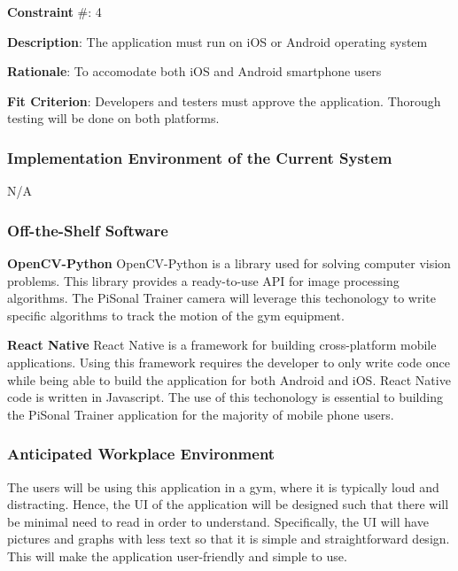 \documentclass{article}
\begin{document}
\medskip

\textbf{Constraint} \#: 4

\textbf{Description}: The application must run on iOS or Android operating system

\textbf{Rationale}: To accomodate both iOS and Android smartphone users

\textbf{Fit Criterion}: Developers and testers must approve the application. Thorough testing will be done on both platforms.

\medskip





\subsubsection{Implementation Environment of the Current System}
N/A

\subsubsection{Off-the-Shelf Software}
\textbf{OpenCV-Python}
OpenCV-Python is a library used for solving computer vision problems. This library provides a ready-to-use API for image processing algorithms. The PiSonal Trainer camera will leverage this techonology to write specific algorithms to track the motion of the gym equipment.

\textbf{React Native}
React Native is a framework for building cross-platform mobile applications. Using this framework requires the developer to only write code once while being able to build the application for both Android and iOS. React Native code is written in Javascript.
The use of this techonology is essential to building the PiSonal Trainer application for the majority of mobile phone users.


\subsubsection{Anticipated Workplace Environment}
The users will be using this application in a gym, where it is typically loud and distracting. Hence, the UI of the application will be designed such that there will be minimal need to read in order to understand. Specifically, the UI will have pictures and graphs with less text so that it is simple and straightforward design. This will make the application user-friendly and simple to use.
\end{document}
